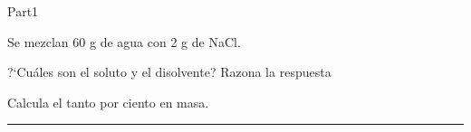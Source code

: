 \documentclass[10pt]{article}
\begin{document}
\begin{exam}{Part1}
\forceNoColor
\useFillerDefault
\fillTypeDots
{}
\eqWLSpacing{18pt}
\vspace*{1cm}
\begin{onehalfspace}%
\begin{problem*}[\auto]
Se mezclan 60 g de agua con 2 g de NaCl.
	\begin{parts}
		\item {} ?`Cuáles son el soluto y el disolvente? Razona la respuesta\dotfill \par \dotfill\par \dotfill
		\item {} Calcula el tanto por ciento en masa.

\begin{solution}[4cm]
\phantom{}
\end{solution}
\begin{workarea}{\sameVspace}
\fbox{\parbox[t][\sameVspace-2\fboxsep-2\fboxrule]{\linewidth-2\fboxsep-2\fboxrule}{\vfill\hfill}}
\end{workarea}
		    \end{parts}
\begin{solution}
\phantom{}
\end{solution}
\end{problem*}
\hrule
\vspace*{0.2cm}
\end{onehalfspace}
\end{exam} 
\end{document}
